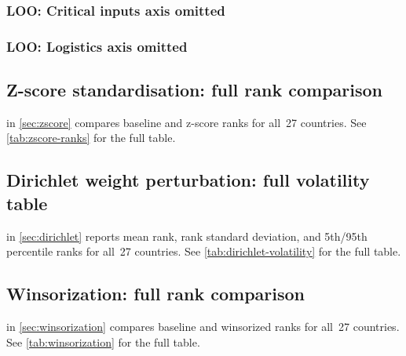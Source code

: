 \clearpage
\subsubsection{LOO: Critical inputs axis omitted}


\clearpage
\subsubsection{LOO: Logistics axis omitted}


\clearpage
\subsection{Z-score standardisation: full rank comparison}

 in \cref{sec:zscore} compares baseline and
z-score ranks for all~27 countries.  See \cref{tab:zscore-ranks} for
the full table.

\subsection{Dirichlet weight perturbation: full volatility table}

 in \cref{sec:dirichlet} reports mean
rank, rank standard deviation, and 5th/95th percentile ranks for
all~27 countries.  See \cref{tab:dirichlet-volatility} for the full
table.

\subsection{Winsorization: full rank comparison}

 in \cref{sec:winsorization} compares
baseline and winsorized ranks for all~27 countries.  See
\cref{tab:winsorization} for the full table.
